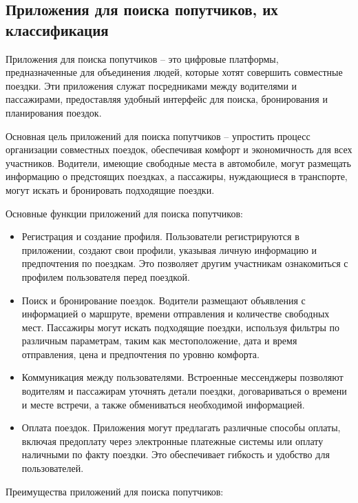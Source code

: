 \subsection{Приложения для поиска попутчиков, их классификация}

Приложения для поиска попутчиков -- это цифровые платформы, предназначенные для объединения людей, которые хотят совершить совместные поездки. Эти приложения служат посредниками между водителями и пассажирами, предоставляя удобный интерфейс для поиска, бронирования и планирования поездок.

Основная цель приложений для поиска попутчиков -- упростить процесс организации совместных поездок, обеспечивая комфорт и экономичность для всех участников. Водители, имеющие свободные места в автомобиле, могут размещать информацию о предстоящих поездках, а пассажиры, нуждающиеся в транспорте, могут искать и бронировать подходящие поездки.

Основные функции приложений для поиска попутчиков:

\begin{itemize}
	\item Регистрация и создание профиля. Пользователи регистрируются в приложении, создают свои профили, указывая личную информацию и предпочтения по поездкам. Это позволяет другим участникам ознакомиться с профилем пользователя перед поездкой.
	
	\item Поиск и бронирование поездок. Водители размещают объявления с информацией о маршруте, времени отправления и количестве свободных мест. Пассажиры могут искать подходящие поездки, используя фильтры по различным параметрам, таким как местоположение, дата и время отправления, цена и предпочтения по уровню комфорта.
	
	\item Коммуникация между пользователями. Встроенные мессенджеры позволяют водителям и пассажирам уточнять детали поездки, договариваться о времени и месте встречи, а также обмениваться необходимой информацией.
	
	\item Оплата поездок. Приложения могут предлагать различные способы оплаты, включая предоплату через электронные платежные системы или оплату наличными по факту поездки. Это обеспечивает гибкость и удобство для пользователей.
\end{itemize}

Преимущества приложений для поиска попутчиков:

